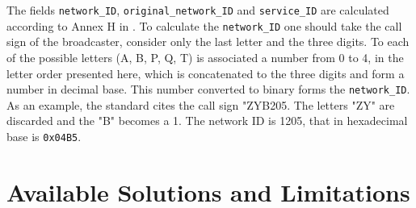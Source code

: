 \documentclass[
	12pt,				%
	openright,			%
	twoside,			%
	a4paper,			%
	brazil,
	french,				%
	english
	]{abntex2}
\begin{document}
The fields \texttt{network\hspace{0.1mm}\_\hspace{0.1mm}ID}, \texttt{original\hspace{0.1mm}\_\hspace{0.1mm}network\hspace{0.1mm}\_\hspace{0.1mm}ID} and \texttt{service\hspace{0.1mm}\_\hspace{0.1mm}ID} are calculated according to Annex H in \cite{NBR}. To calculate the \texttt {network\hspace{0.1mm}\_\hspace{0.1mm}ID} one should take the call sign of the broadcaster, consider only the last letter and the three digits. To each of the possible letters (A, B, P, Q, T) is associated a number from 0 to 4, in the letter order presented here, which is concatenated to the three digits and form a number in decimal base. This number converted to binary forms the \texttt{network\hspace{0.1mm}\_\hspace{0.1mm}ID}. As an example, the standard cites the call sign "ZYB205. The letters "ZY" are discarded and the "B" becomes a 1. The network ID is 1205, that in hexadecimal base is \texttt{0x04B5}.




\chapter{Available Solutions and Limitations}
\end{document}

